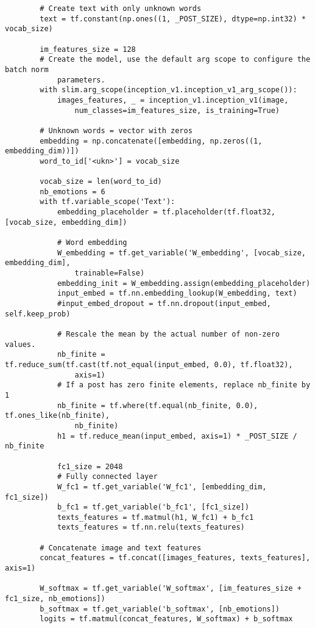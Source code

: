 \begin{lstlisting}
        # Create text with only unknown words
        text = tf.constant(np.ones((1, _POST_SIZE), dtype=np.int32) * vocab_size)

        im_features_size = 128
        # Create the model, use the default arg scope to configure the batch norm 
            parameters.
        with slim.arg_scope(inception_v1.inception_v1_arg_scope()):
            images_features, _ = inception_v1.inception_v1(image, 
                num_classes=im_features_size, is_training=True)

        # Unknown words = vector with zeros
        embedding = np.concatenate([embedding, np.zeros((1, embedding_dim))])
        word_to_id['<ukn>'] = vocab_size

        vocab_size = len(word_to_id)
        nb_emotions = 6
        with tf.variable_scope('Text'):
            embedding_placeholder = tf.placeholder(tf.float32, [vocab_size, embedding_dim])
        
            # Word embedding
            W_embedding = tf.get_variable('W_embedding', [vocab_size, embedding_dim], 
                trainable=False)
            embedding_init = W_embedding.assign(embedding_placeholder)
            input_embed = tf.nn.embedding_lookup(W_embedding, text)
            #input_embed_dropout = tf.nn.dropout(input_embed, self.keep_prob)

            # Rescale the mean by the actual number of non-zero values.
            nb_finite = tf.reduce_sum(tf.cast(tf.not_equal(input_embed, 0.0), tf.float32), 
                axis=1)
            # If a post has zero finite elements, replace nb_finite by 1
            nb_finite = tf.where(tf.equal(nb_finite, 0.0), tf.ones_like(nb_finite), 
                nb_finite)
            h1 = tf.reduce_mean(input_embed, axis=1) * _POST_SIZE / nb_finite

            fc1_size = 2048
            # Fully connected layer
            W_fc1 = tf.get_variable('W_fc1', [embedding_dim, fc1_size])
            b_fc1 = tf.get_variable('b_fc1', [fc1_size])
            texts_features = tf.matmul(h1, W_fc1) + b_fc1
            texts_features = tf.nn.relu(texts_features)

        # Concatenate image and text features
        concat_features = tf.concat([images_features, texts_features], axis=1)

        W_softmax = tf.get_variable('W_softmax', [im_features_size + fc1_size, nb_emotions])
        b_softmax = tf.get_variable('b_softmax', [nb_emotions])
        logits = tf.matmul(concat_features, W_softmax) + b_softmax


\end{lstlisting}
